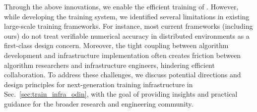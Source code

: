 Through the above innovations, we enable the efficient training of \magi. However, while developing the \magi training system, we identified several limitations in existing large-scale training frameworks. For instance, most current frameworks (including ours) do not treat verifiable numerical accuracy in distributed environments as a first-class design concern. Moreover, the tight coupling between algorithm development and infrastructure implementation often creates friction between algorithm researchers and infrastructure engineers, hindering efficient collaboration. To address these challenges, we discuss potential directions and design principles for next-generation training infrastructure in Sec.~\ref{sec:train_infra_odin}, with the goal of providing insights and practical guidance for the broader research and engineering community.














